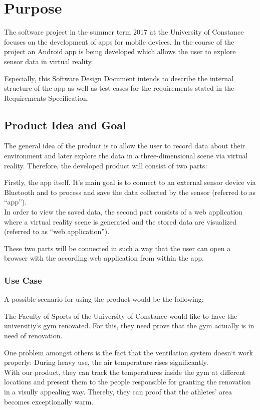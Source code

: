 \section{Purpose}

The software project in the summer term 2017 at the University of Constance focuses on the development of apps for mobile devices. In the course of the project an Android app is being developed which allows the user to explore sensor data in virtual reality.

Especially, this Software Design Document intends to describe the internal structure of the app as well as test cases for the requirements stated in the Requirements Specification.

\subsection{Product Idea and Goal}

The general idea of the product is to allow the user to record data about their environment and later explore the data in a three-dimensional scene via virtual reality. Therefore, the developed product will consist of two parts:

Firstly, the app itself. It's main goal is to connect to an external sensor device via Bluetooth and to process and save the data collected by the sensor (referred to as ``app''). \\
In order to view the saved data, the second part consists of a web application where a virtual reality scene is generated and the stored data are visualized (referred to as ``web application'').

These two parts will be connected in such a way that the user can open a browser with the according web application from within the app.

\subsubsection{Use Case}

A possible scenario for using the product would be the following:

The Faculty of Sports of the University of Constance would like to have the universitiy`s gym renovated. For this, they need prove that the gym actually is in need of renovation.

One problem amongst others is the fact that the ventilation system doesn`t work properly: During heavy use, the air temperature rises significantly. \\
With our product, they can track the temperatures inside the gym at different locations and present them to the people responsible for granting the renovation in a visully appealing way. Thereby, they can proof that the athletes' area becomes exceptionally warm.

